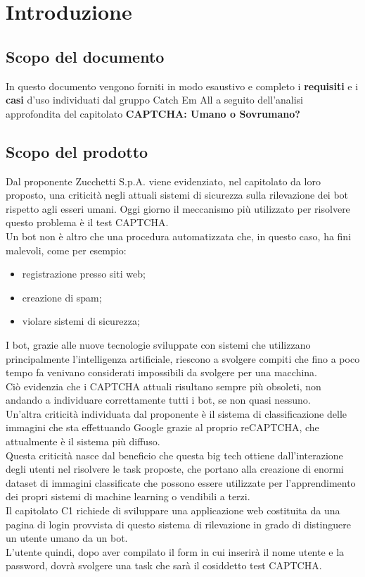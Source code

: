 \section{Introduzione}

\subsection{Scopo del documento}
In questo documento vengono forniti in modo esaustivo e completo i \textbf{requisiti} e i \textbf{casi} d'uso individuati dal gruppo Catch Em All a seguito dell'analisi approfondita del capitolato \textbf{CAPTCHA: Umano o Sovrumano?}

\subsection{Scopo del prodotto}
Dal proponente Zucchetti S.p.A. viene evidenziato, nel capitolato da loro proposto, una criticità negli attuali sistemi di sicurezza sulla rilevazione dei bot rispetto agli esseri umani. Oggi giorno il meccanismo più utilizzato per risolvere questo problema è il test CAPTCHA.\\
Un bot non è altro che una procedura automatizzata che, in questo caso, ha fini malevoli, come per esempio:
\begin{itemize}
 	\item registrazione presso siti web;
	\item creazione di spam;
	\item violare sistemi di sicurezza;
\end{itemize}
I bot, grazie alle nuove tecnologie sviluppate con sistemi che utilizzano principalmente l'intelligenza artificiale, riescono a svolgere compiti che fino a poco tempo fa venivano considerati impossibili da svolgere per una macchina.\\
Ciò evidenzia che i CAPTCHA attuali risultano sempre più obsoleti, non andando a individuare correttamente tutti i bot, se non quasi nessuno.\\
Un'altra criticità individuata dal proponente è il sistema di classificazione delle immagini che sta effettuando Google grazie al proprio reCAPTCHA, che attualmente è il sistema più diffuso.\\
Questa criticità nasce dal beneficio che questa big tech ottiene dall'interazione degli utenti nel risolvere le task proposte, che portano alla creazione di enormi dataset di immagini classificate che possono essere utilizzate per l'apprendimento dei propri sistemi di machine learning o vendibili a terzi.\\
Il capitolato C1 richiede di sviluppare una applicazione web costituita da una pagina di login provvista di questo sistema di rilevazione in grado di distinguere un utente umano da un bot.\\
L'utente quindi, dopo aver compilato il form in cui inserirà il nome utente e la password, dovrà svolgere una task che sarà il cosiddetto test CAPTCHA.



